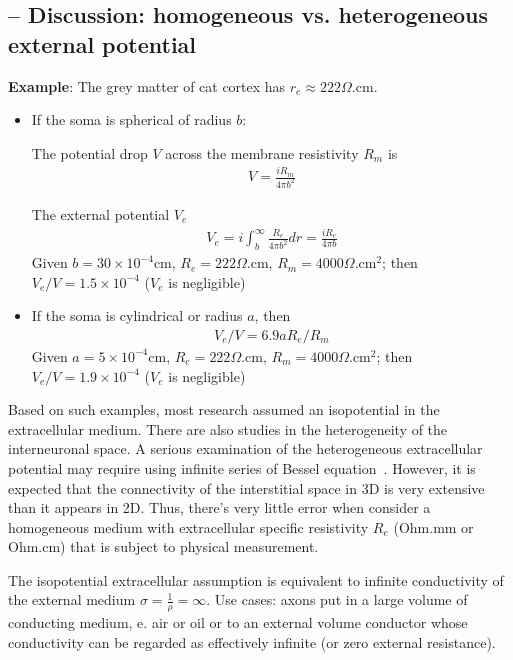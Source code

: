 

\subsection{-- Discussion: homogeneous vs. heterogeneous external potential}
\label{sec:disc-homog-vs}


{\bf Example}: The grey matter of cat cortex has $r_e\approx
222\Omega$.cm.
\begin{itemize}
\item If the soma is spherical of radius $b$:

The potential drop $V$ across the membrane resistivity $R_m$ is
\begin{eqnarray*}
  V = \frac{iR_m}{4\pi b^2}
\end{eqnarray*}

The external potential $V_e$ 
\begin{eqnarray*}
  V_e = i\int_b^\infty \frac{R_e}{4\pi b^2} dr = \frac{iR_e}{4\pi b}
\end{eqnarray*}
Given $b=30\times 10^{-4}$cm, $R_e=222\Omega$.cm, $R_m=4000
\Omega$.cm$^2$; then $V_e/V = 1.5\times 10^{-4}$ ($V_e$ is negligible)
\item If the soma is cylindrical or radius $a$, then
  \begin{eqnarray*}
    V_e/V = 6.9a R_e/R_m
  \end{eqnarray*}
Given $a=5\times 10^{-4}$cm, $R_e=222\Omega$.cm, $R_m=4000
\Omega$.cm$^2$; then $V_e/V = 1.9\times 10^{-4}$ ($V_e$ is negligible)
\end{itemize}

Based on such examples, most research assumed an isopotential in the
extracellular medium. There are also studies in the heterogeneity of
the interneuronal space. A serious examination of the heterogeneous
extracellular potential may require using infinite series of Bessel
equation~\cite{rall1959bdt}. However, it is expected that the
connectivity of the interstitial space in 3D is very extensive than it
appears in 2D. Thus, there's very little error when consider a
homogeneous medium with extracellular specific resistivity $R_e$
(Ohm.mm or Ohm.cm) that is subject to physical measurement.

The isopotential extracellular assumption is equivalent to infinite
conductivity of the external medium $\sigma=\frac{1}{\rho} =
\infty$. Use cases: axons put in a large volume of conducting medium,
e. air or oil or to an external volume conductor whose conductivity
can be regarded as effectively infinite (or zero external resistance). 

